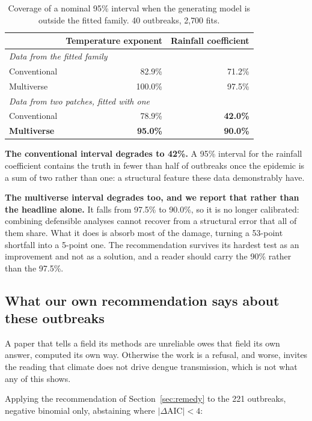 \documentclass[11pt,a4paper]{article}
\begin{document}
\begin{table}[htbp]
\centering
\caption{Coverage of a nominal 95\% interval when the generating model is outside
the fitted family. 40 outbreaks, 2{,}700 fits.}
\begin{tabular}{lrr}
\toprule
& Temperature exponent & Rainfall coefficient \\
\midrule
\multicolumn{3}{l}{\emph{Data from the fitted family}} \\
\quad Conventional & 82.9\% & 71.2\% \\
\quad Multiverse & 100.0\% & 97.5\% \\
\midrule
\multicolumn{3}{l}{\emph{Data from two patches, fitted with one}} \\
\quad Conventional & 78.9\% & \textbf{42.0\%} \\
\quad \textbf{Multiverse} & \textbf{95.0\%} & \textbf{90.0\%} \\
\bottomrule
\end{tabular}
\end{table}

\textbf{The conventional interval degrades to 42\%.} A 95\% interval for the
rainfall coefficient contains the truth in fewer than half of outbreaks once the
epidemic is a sum of two rather than one: a structural feature these data
demonstrably have.

\textbf{The multiverse interval degrades too, and we report that rather than the
headline alone.} It falls from 97.5\% to 90.0\%, so it is no longer calibrated:
combining defensible analyses cannot recover from a structural error that all of
them share. What it does is absorb most of the damage, turning a 53-point
shortfall into a 5-point one. The recommendation survives its hardest test as an
improvement and not as a solution, and a reader should carry the 90\% rather than
the 97.5\%.

\subsection{What our own recommendation says about these outbreaks}
\label{sec:ownanswer}

A paper that tells a field its methods are unreliable owes that field its own
answer, computed its own way. Otherwise the work is a refusal, and worse, invites
the reading that climate does not drive dengue transmission, which is not what
any of this shows.

Applying the recommendation of Section~\ref{sec:remedy} to the 221 outbreaks, negative binomial only, abstaining where $|\Delta\mathrm{AIC}| < 4$:
\end{document}
